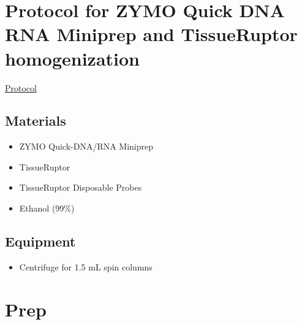 \documentclass[
  letterpaper,
  DIV=11,
  numbers=noendperiod]{scrreprt}
\providecommand{\tightlist}{%
  \setlength{\itemsep}{0pt}\setlength{\parskip}{0pt}}\usepackage{longtable,booktabs,array}
\begin{document}
\hypertarget{protocol-for-zymo-quick-dna-rna-miniprep-and-tissueruptor-homogenization}{%
\section*{\texorpdfstring{\textbf{Protocol for ZYMO Quick DNA RNA
Miniprep and TissueRuptor
homogenization}}{Protocol for ZYMO Quick DNA RNA Miniprep and TissueRuptor homogenization}}\label{protocol-for-zymo-quick-dna-rna-miniprep-and-tissueruptor-homogenization}}


\href{https://files.zymoresearch.com/protocols/_d7001_quick-dna-rna_miniprep_kit.pdf}{Protocol}

\hypertarget{materials-1}{%
\subsection*{\texorpdfstring{\textbf{Materials}}{Materials}}\label{materials-1}}

\begin{itemize}
\item
  ZYMO Quick-DNA/RNA Miniprep
\item
  TissueRuptor
\item
  TissueRuptor Disposable Probes
\item
  Ethanol (99\%)
\end{itemize}

\hypertarget{equipment-2}{%
\subsection*{\texorpdfstring{\textbf{Equipment}}{Equipment}}\label{equipment-2}}

\begin{itemize}
\tightlist
\item
  Centrifuge for 1.5 mL spin columns
\end{itemize}

\hypertarget{prep}{%
\section*{\texorpdfstring{\textbf{Prep}}{Prep}}\label{prep}}
\end{document}
